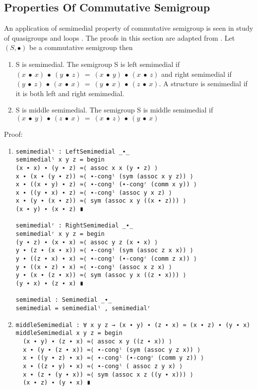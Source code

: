 \subsection{Properties Of Commutative Semigroup}
An application of semimedial property of commutative semigroup is seen in study
of quasigroups and loops \cite{liaqat2021some}. The proofs in this section are
adapted from \cite{deng2016characterizations}. Let $(S, ∙)$ be a commutative
semigroup then
\begin{enumerate}
\item S is semimedial. The semigroup S is left semimedial if  \(
(x\ ∙\ x)\ ∙\ (y\ ∙\ z)\ =\ (x\ ∙\ y)\ ∙\ (x\ ∙\ z) \) and right
semimedial if \( (y\ ∙\ z)\ ∙\ (x\ ∙\ x)\ =\ (y\ ∙\ x)\ ∙\ (z\ ∙\ x) \).
A structure is semimedial if it is both left and right semimedial. 
\item S is middle semimedial. The semigroup S is middle semimedial if
\((x\ ∙\ y)\ ∙\ (z\ ∙\ x)\ =\ (x\ ∙\ z)\ ∙\ (y\ ∙\
x)\)
\end{enumerate}
Proof:
\begin{enumerate}
\item
\begin{verbatim}
semimedialˡ : LeftSemimedial _∙_
semimedialˡ x y z = begin
(x ∙ x) ∙ (y ∙ z) ≈⟨ assoc x x (y ∙ z) ⟩
x ∙ (x ∙ (y ∙ z)) ≈⟨ ∙-congˡ (sym (assoc x y z)) ⟩
x ∙ ((x ∙ y) ∙ z) ≈⟨ ∙-congˡ (∙-congʳ (comm x y)) ⟩
x ∙ ((y ∙ x) ∙ z) ≈⟨ ∙-congˡ (assoc y x z) ⟩
x ∙ (y ∙ (x ∙ z)) ≈⟨ sym (assoc x y ((x ∙ z))) ⟩
(x ∙ y) ∙ (x ∙ z) ∎

semimedialʳ : RightSemimedial _∙_
semimedialʳ x y z = begin
(y ∙ z) ∙ (x ∙ x) ≈⟨ assoc y z (x ∙ x) ⟩
y ∙ (z ∙ (x ∙ x)) ≈⟨ ∙-congˡ (sym (assoc z x x)) ⟩
y ∙ ((z ∙ x) ∙ x) ≈⟨ ∙-congˡ (∙-congʳ (comm z x)) ⟩
y ∙ ((x ∙ z) ∙ x) ≈⟨ ∙-congˡ (assoc x z x) ⟩
y ∙ (x ∙ (z ∙ x)) ≈⟨ sym (assoc y x ((z ∙ x))) ⟩
(y ∙ x) ∙ (z ∙ x) ∎

semimedial : Semimedial _∙_
semimedial = semimedialˡ , semimedialʳ
\end{verbatim}
\item
\begin{verbatim}
middleSemimedial : ∀ x y z → (x ∙ y) ∙ (z ∙ x) ≈ (x ∙ z) ∙ (y ∙ x)
middleSemimedial x y z = begin
  (x ∙ y) ∙ (z ∙ x) ≈⟨ assoc x y ((z ∙ x)) ⟩
  x ∙ (y ∙ (z ∙ x)) ≈⟨ ∙-congˡ (sym (assoc y z x)) ⟩
  x ∙ ((y ∙ z) ∙ x) ≈⟨ ∙-congˡ (∙-congʳ (comm y z)) ⟩
  x ∙ ((z ∙ y) ∙ x) ≈⟨ ∙-congˡ ( assoc z y x) ⟩
  x ∙ (z ∙ (y ∙ x)) ≈⟨ sym (assoc x z ((y ∙ x))) ⟩
  (x ∙ z) ∙ (y ∙ x) ∎
\end{verbatim}
\end{enumerate}
